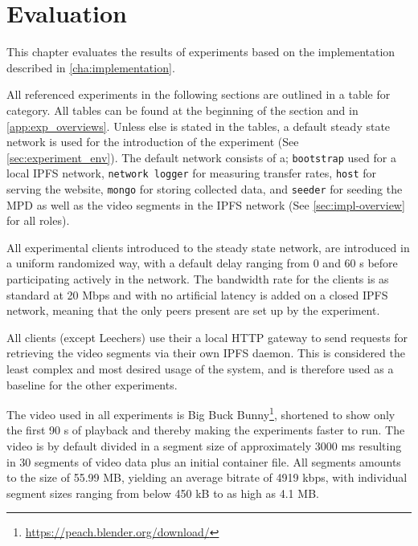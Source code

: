 \chapter{Evaluation}
\label{cha:evaluation}
This chapter evaluates the results of experiments based on the implementation described in \autoref{cha:implementation}.

All referenced experiments in the following sections are outlined in a table for category. All tables can be found at the beginning of the section and in \autoref{app:exp_overviews}. Unless else is stated in the tables, a default steady state network is used for the introduction of the experiment (See \autoref{sec:experiment_env}). The default network consists of a; \texttt{bootstrap} used for a local \ac{IPFS} network, \texttt{network logger} for measuring transfer rates, \texttt{host} for serving the website, \texttt{mongo} for storing collected data, and \texttt{seeder} for seeding the \ac{MPD} as well as the video segments in the \ac{IPFS} network (See  \autoref{sec:impl-overview} for all roles).

All experimental clients introduced to the steady state network, are introduced in a uniform randomized way, with a default delay ranging from 0 and 60 \ac{s} before participating actively in the network.
The bandwidth rate for the clients is as standard at 20 \ac{Mbps} and with no artificial latency is added on a closed \ac{IPFS} network, meaning that the only peers present are set up by the experiment.

All clients (except Leechers) use their a local \ac{HTTP} gateway to send requests for retrieving the video segments via their own \ac{IPFS} daemon. This is considered the least complex and most desired usage of the system, and is therefore used as a baseline for the other experiments.

The video used in all experiments is Big Buck Bunny\footnote{\url{https://peach.blender.org/download/}}, shortened to show only the first 90 \ac{s} of playback and thereby making the experiments faster to run. The video is by default divided in a segment size of approximately 3000 \ac{ms} resulting in 30 segments of video data plus an initial container file. All segments amounts to the size of 55.99 \ac{MB}, yielding an average bitrate of 4919 \ac{kbps}, with individual segment sizes ranging from below 450 \ac{kB} to as high as 4.1 \ac{MB}.

